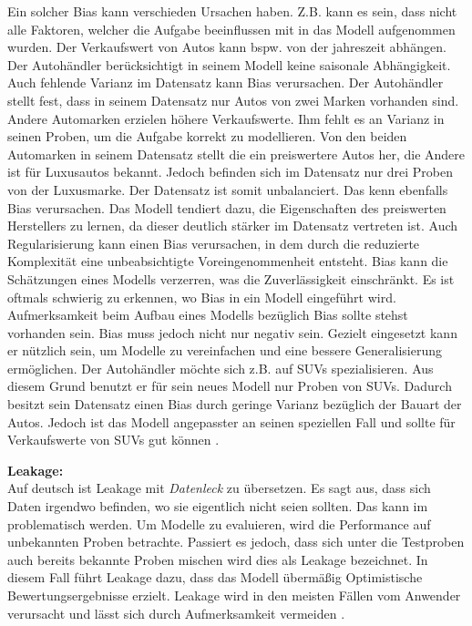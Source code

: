 
Ein solcher \gls{Bias} kann verschieden Ursachen haben. Z.B. kann es sein, dass nicht alle Faktoren, welcher die Aufgabe beeinflussen mit in das Modell aufgenommen wurden. Der Verkaufswert von Autos kann bspw. von der jahreszeit abhängen. Der Autohändler berücksichtigt in seinem Modell keine saisonale Abhängigkeit. Auch fehlende Varianz im Datensatz kann \gls{Bias} verursachen. Der Autohändler stellt fest, dass in seinem Datensatz nur Autos von zwei Marken vorhanden sind. Andere Automarken erzielen höhere Verkaufswerte. Ihm fehlt es an Varianz in seinen Proben, um die Aufgabe korrekt zu modellieren. Von den beiden Automarken in seinem Datensatz stellt die ein preiswertere Autos her, die Andere ist für Luxusautos bekannt. Jedoch  befinden sich im Datensatz nur drei Proben von der Luxusmarke. Der Datensatz ist somit unbalanciert. Das kenn ebenfalls \gls{Bias} verursachen. Das Modell tendiert dazu, die Eigenschaften des preiswerten Herstellers zu lernen, da dieser deutlich stärker im Datensatz vertreten ist. Auch \gls{Regularisierung} kann einen \gls{Bias} verursachen, in dem durch die reduzierte Komplexität eine unbeabsichtigte Voreingenommenheit entsteht. \gls{Bias} kann die Schätzungen eines Modells verzerren, was die Zuverlässigkeit einschränkt. Es ist oftmals schwierig zu erkennen, wo \gls{Bias} in ein Modell eingeführt wird. Aufmerksamkeit beim Aufbau eines Modells bezüglich \gls{Bias} sollte stehst vorhanden sein. \gls{Bias} muss jedoch nicht nur negativ sein. Gezielt eingesetzt kann er nützlich sein, um Modelle zu vereinfachen und eine bessere \gls{Generalisierung} ermöglichen. Der Autohändler möchte sich z.B. auf SUVs spezialisieren. Aus diesem Grund benutzt er für sein neues Modell nur Proben von SUVs. Dadurch besitzt sein Datensatz einen \gls{Bias} durch geringe Varianz bezüglich der Bauart der Autos. Jedoch ist das Modell angepasster an seinen speziellen Fall und sollte für Verkaufswerte von SUVs gut  können \cite{Burkov.2019, Goodfellow.2016, Mehrabi.2019}. \par

\textbf{\gls{Leakage}:}\\
Auf deutsch ist \gls{Leakage} mit \textit{Datenleck} zu übersetzen. Es sagt aus, dass sich Daten irgendwo befinden, wo sie eigentlich nicht seien sollten. Das kann im  problematisch werden. Um Modelle zu evaluieren, wird die Performance auf unbekannten Proben betrachte. Passiert es jedoch, dass sich unter die Testproben auch bereits bekannte Proben mischen wird dies als \gls{Leakage} bezeichnet. In diesem Fall führt \gls{Leakage} dazu, dass das Modell übermäßig Optimistische Bewertungsergebnisse erzielt. \gls{Leakage} wird in den meisten Fällen vom Anwender verursacht und lässt sich durch Aufmerksamkeit vermeiden \cite{Zheng.2015}.


